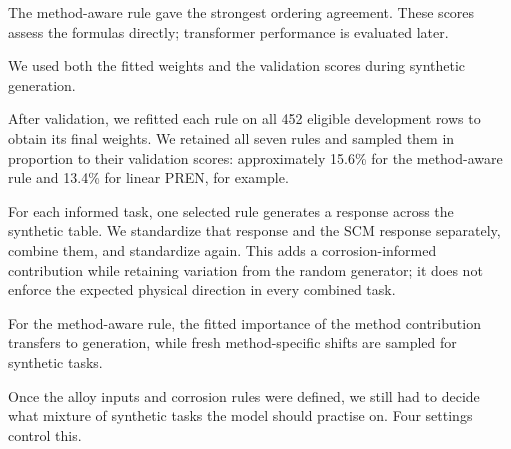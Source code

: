 \documentclass[11pt]{article}
\begin{document}
The method-aware rule gave the strongest ordering agreement. These scores assess the
formulas directly; transformer performance is evaluated later.

We used both the fitted weights and the validation scores during synthetic generation.

After validation, we refitted each rule on all 452 eligible development rows to obtain its
final weights. We retained all seven rules and sampled them in proportion to their
validation scores: approximately 15.6\% for the method-aware rule and 13.4\% for linear
PREN, for example.

For each informed task, one selected rule generates a response across the synthetic table.
We standardize that response and the SCM response separately, combine them, and standardize
again. This adds a corrosion-informed contribution while retaining variation from the random
generator; it does not enforce the expected physical direction in every combined task.

For the method-aware rule, the fitted importance of the method contribution transfers to
generation, while fresh method-specific shifts are sampled for synthetic tasks.

Once the alloy inputs and corrosion rules were defined, we still had to decide what mixture
of synthetic tasks the model should practise on. Four settings control this.
\end{document}
